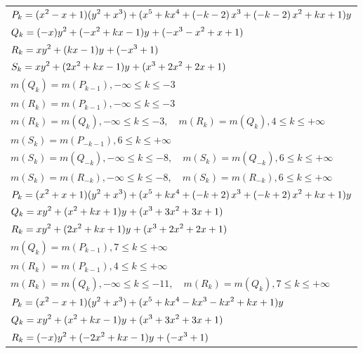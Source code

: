 \documentclass{amsart}
\begin{document}
\begin{longtable}{|l|}
\hline
\(\displaystyle P_k=(x^2
 - x
 + 1)(y^2+x^3)+(x^5
 + k\*x^4
 + \left(-k
 - 2\right) \*x^3
 + \left(-k
 - 2\right) \*x^2
 + k\*x
 + 1)y\)\\
\(\displaystyle Q_k=(-x)y^{2}+(-x^2
 + k\*x
 - 1)y^{}+(-x^3
 - x^2
 + x
 + 1)\)\\
\(\displaystyle R_k=xy^{2}+(k\*x
 - 1)y^{}+(-x^3
 + 1)\)\\
\(\displaystyle S_k=xy^{2}+(2\*x^2
 + k\*x
 - 1)y^{}+(x^3
 + 2\*x^2
 + 2\*x
 + 1)\)\\
\(\displaystyle m(Q_k) = m(P_{k
 - 1}),-\infty \leqslant k \leqslant -3\)\\
\(\displaystyle m(R_k) = m(P_{k
 - 1}),-\infty \leqslant k \leqslant -3\)\\
\(\displaystyle m(R_k) = m(Q_{k}),-\infty \leqslant k \leqslant -3,\quad m(R_k) = m(Q_{k}),4 \leqslant k \leqslant +\infty\)\\
\(\displaystyle m(S_k) = m(P_{-k
 - 1}),6 \leqslant k \leqslant +\infty\)\\
\(\displaystyle m(S_k) = m(Q_{-k}),-\infty \leqslant k \leqslant -8,\quad m(S_k) = m(Q_{-k}),6 \leqslant k \leqslant +\infty\)\\
\(\displaystyle m(S_k) = m(R_{-k}),-\infty \leqslant k \leqslant -8,\quad m(S_k) = m(R_{-k}),6 \leqslant k \leqslant +\infty\)\\
\hline
\(\displaystyle P_k=(x^2
 + x
 + 1)(y^2+x^3)+(x^5
 + k\*x^4
 + \left(-k
 + 2\right) \*x^3
 + \left(-k
 + 2\right) \*x^2
 + k\*x
 + 1)y\)\\
\(\displaystyle Q_k=xy^{2}+(x^2
 + k\*x
 + 1)y^{}+(x^3
 + 3\*x^2
 + 3\*x
 + 1)\)\\
\(\displaystyle R_k=xy^{2}+(2\*x^2
 + k\*x
 + 1)y^{}+(x^3
 + 2\*x^2
 + 2\*x
 + 1)\)\\
\(\displaystyle m(Q_k) = m(P_{k
 - 1}),7 \leqslant k \leqslant +\infty\)\\
\(\displaystyle m(R_k) = m(P_{k
 - 1}),4 \leqslant k \leqslant +\infty\)\\
\(\displaystyle m(R_k) = m(Q_{k}),-\infty \leqslant k \leqslant -11,\quad m(R_k) = m(Q_{k}),7 \leqslant k \leqslant +\infty\)\\
\hline
\(\displaystyle P_k=(x^2
 - x
 + 1)(y^2+x^3)+(x^5
 + k\*x^4
 - k\*x^3
 - k\*x^2
 + k\*x
 + 1)y\)\\
\(\displaystyle Q_k=xy^{2}+(x^2
 + k\*x
 - 1)y^{}+(x^3
 + 3\*x^2
 + 3\*x
 + 1)\)\\
\(\displaystyle R_k=(-x)y^{2}+(-2\*x^2
 + k\*x
 - 1)y^{}+(-x^3
 + 1)\)\\

\end{longtable}
\end{document}
